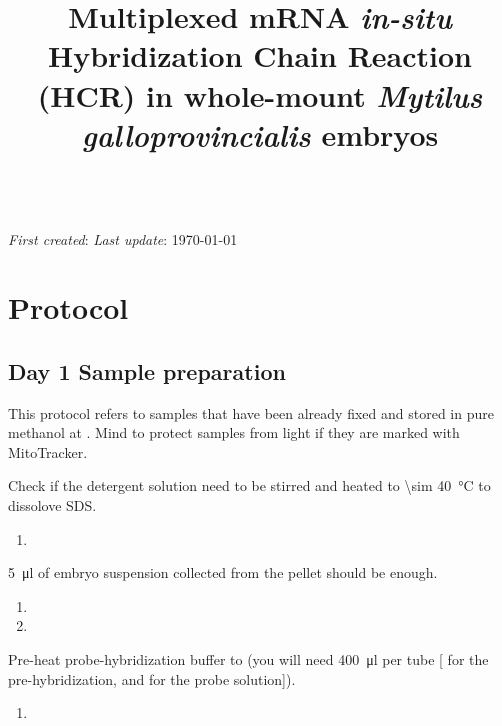 \documentclass[10pt]{report}
\makeatletter
\renewcommand\maketitle{
{\begin{center}
{\Large \bfseries \@title }\\
{\small \emph{First created}: \DTMdisplaydate{2023}{12}{14}{-1}\hfill%
\setstretch{1.0} \small \hfill \emph{Last update}: \today}
\end{center}}} %
\makeatother
\begin{document}

\title{\vspace{-3em} Multiplexed mRNA \textit{in-situ} Hybridization Chain Reaction (HCR) in whole-mount \emph{Mytilus galloprovincialis} embryos}
\maketitle
\thispagestyle{plain}

\section*{\vspace{-1em} \textendash{} Protocol \textendash{}}

\subsection*{Day 1 \textendash{} Sample preparation}

\alert{This protocol refers to samples that have been already fixed and stored in pure methanol at \minustwenty. Mind to protect samples from light if they are marked with MitoTracker.}

\alert{Check if the detergent solution need to be stirred and heated to \qty{\sim 40}{\degreeCelsius} to dissolove SDS.}

\begin{enumerate}[series = steps]
	\item {}
\end{enumerate}

\bigskip\alert{\qty{5}{\ul} of embryo suspension collected from the pellet should be enough.}

\begin{enumerate}[resume = steps]
	\item {}
	\item {}
\end{enumerate}

\bigskip\alert{Pre-heat probe-hybridization buffer to \thirtysevendegree{} (you will need \qty{400}{\ul} per tube [\twohunmicrol{} for the pre-hybridization, and \twohunmicrol{} for the probe solution]).}

\begin{enumerate}[resume = steps]
	\item {}
\end{enumerate}
\end{document}
